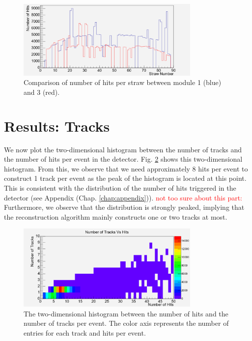 \documentclass[a4paper]{report}
\numberwithin{equation}{section}
\begin{document}
\begin{figure}[!h]
	\centering
	\includegraphics[width=0.8\textwidth]{hitsperstraw_m1m3.png}
	\caption{Comparison of number of hits per straw between module 1 (blue) and 3 (red). }
	\label{fig:tracksvshits_comp}
\end{figure}

\section{Results: Tracks}

We now plot the two-dimensional histogram between the number of tracks and the number of hits per event in the detector. Fig. \ref{fig:tracksvshits}
shows this two-dimensional histogram. From this, we observe that we need approximately 8 hits per event to construct 1 track per event
as the peak of the histogram is located at this point. This is consistent with the distribution of the number of hits triggered in 
the detector (see Appendix (Chap. \ref{chap:appendix})).  \textcolor{red}{not too sure about this part: }Furthermore, we observe that the distribution is strongly peaked, implying that 
the reconstruction algorithm mainly constructs one or two tracks at most. \par 

\begin{figure}[!h]
	\centering
	\includegraphics[width=0.8\textwidth]{trackvshits.png}
	\caption{The two-dimensional histogram between the number of hits and the number of tracks per event. 
			The color axis represents the number of entries for each track and hits per event.}
	\label{fig:tracksvshits}
\end{figure}
\end{document}
